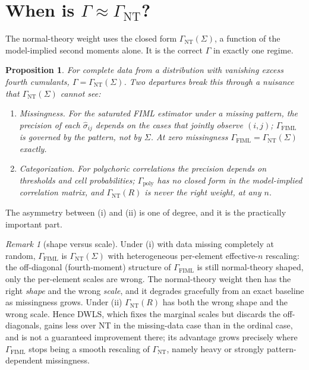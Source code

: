 \documentclass[11pt]{article}
\newcommand{\Gnt}{\Gamma_{\mathrm{NT}}}
\newcommand{\Gfiml}{\Gamma_{\mathrm{FIML}}}
\newcommand{\Gpoly}{\Gamma_{\mathrm{poly}}}
\theoremstyle{plain}
\newtheorem{proposition}{Proposition}
\theoremstyle{remark}
\newtheorem*{remark}{Remark}
\begin{document}
\section{When is $\Gamma\approx\Gnt$?}

The normal-theory weight uses the closed form $\Gnt(\Sigma)$, a function of the
model-implied second moments alone. It is the correct $\Gamma$ in exactly one
regime.

\begin{proposition}\label{prop:license}
For complete data from a distribution with vanishing excess fourth cumulants,
$\Gamma=\Gnt(\Sigma)$. Two departures break this through a nuisance that
$\Gnt(\Sigma)$ cannot see:
\begin{enumerate}
\item[(i)] \emph{Missingness.} For the saturated FIML estimator under a missing
pattern, the precision of each $\hat\sigma_{ij}$ depends on the cases that
jointly observe $(i,j)$; $\Gfiml$ is governed by the pattern, not by $\Sigma$.
At zero missingness $\Gfiml=\Gnt(\Sigma)$ exactly.
\item[(ii)] \emph{Categorization.} For polychoric correlations the precision
depends on thresholds and cell probabilities; $\Gpoly$ has no closed form in the
model-implied correlation matrix, and $\Gnt(R)$ is never the right weight, at any
$n$.
\end{enumerate}
\end{proposition}

The asymmetry between (i) and (ii) is one of degree, and it is the practically
important part.

\begin{remark}[shape versus scale]
Under (i) with data missing completely at random, $\Gfiml$ is $\Gnt(\Sigma)$
with heterogeneous per-element effective-$n$ rescaling: the off-diagonal
(fourth-moment) structure of $\Gfiml$ is still normal-theory shaped, only the
per-element scales are wrong. The normal-theory weight then has the right
\emph{shape} and the wrong \emph{scale}, and it degrades gracefully from an exact
baseline as missingness grows. Under (ii) $\Gnt(R)$ has both the wrong shape and
the wrong scale. Hence DWLS, which fixes the marginal scales but discards the
off-diagonals, gains less over NT in the missing-data case than in the ordinal
case, and is not a guaranteed improvement there; its advantage grows precisely
where $\Gfiml$ stops being a smooth rescaling of $\Gnt$, namely heavy or
strongly pattern-dependent missingness.
\end{remark}
\end{document}
